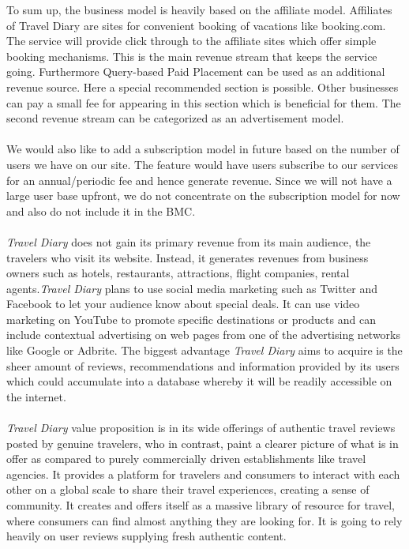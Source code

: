 \documentclass[IN,english]{tumbook}
\begin{document}
To sum up, the business model is heavily based on the affiliate model. Affiliates of Travel 
Diary are sites for convenient booking of vacations like booking.com. The service will provide click through to the affiliate sites which offer simple booking mechanisms. This is the main revenue stream that keeps the service going. Furthermore Query-based Paid Placement can be used as an additional revenue source. Here a special recommended section is possible. Other businesses can pay a small fee for appearing in this section which is beneficial for them. The second revenue stream can be categorized as an advertisement model.\\
\\
We would also like to add a subscription model in future based on the number of users we have on our site. The feature would have users subscribe to our services for an annual/periodic fee and hence generate revenue. Since we will not have a large user base upfront, we do not concentrate on the subscription model for now and also do not include it in the BMC.\\
\\
\emph{Travel Diary} does not gain its primary revenue from its main audience, the travelers who visit its website. Instead, it generates revenues from business owners such as hotels, restaurants, attractions, flight companies, rental agents.\emph{Travel Diary} plans to use social media marketing such as Twitter and Facebook to let your audience know about special deals. It can use video marketing on YouTube to promote specific destinations or products and can include contextual advertising on web pages from one of the advertising networks like Google or Adbrite. The biggest advantage \emph{Travel Diary} aims to acquire is the sheer amount of reviews, recommendations and information provided by its users which could accumulate into a database whereby it will be readily accessible on the internet.\\
\\
\emph{Travel Diary} value proposition is in its wide offerings of authentic travel reviews posted by genuine travelers, who in contrast, paint a clearer picture of what is in offer as compared to purely commercially driven establishments like travel agencies. It provides a platform for travelers and consumers to interact with each other on a global scale to share their travel experiences, creating a sense of community. It creates and offers itself as a massive library of resource for travel, where consumers can find almost anything they are looking for. It is going to rely heavily on user reviews supplying fresh authentic content.
\end{document}
